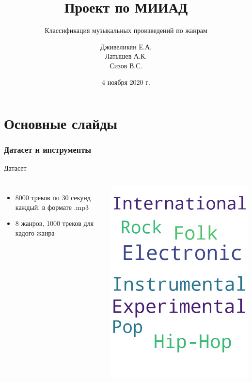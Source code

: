 \documentclass[c, aspectratio = 43]{beamer}
\title{Проект по МИИАД}
\subtitle{Классификация музыкальных произведений по жанрам}
\author{Дживеликян Е.А. \\
        Латышев А.К. \\
        Сизов В.С.}
\date{4 ноября 2020 г.}
\institute[НИУ ``МФТИ'']{ Национальный исследовательский университет\\``Московский физико-технический институт''}
\begin{document}
{
	\beamertemplatenavigationsymbolsempty
}
\part{Основные слайды}
\section{Датасет и инструменты}
\begin{frame}{Датасет}
    \begin{columns}
        \begin{itemize}
            \item 8000 треков по 30 секунд каждый, в формате .mp3
            \item 8 жанров, 1000 треков для кадого жанра
        \end{itemize}
        \includegraphics[width=\linewidth]{genres.png}
    \end{columns}
\end{frame}
\end{document}
